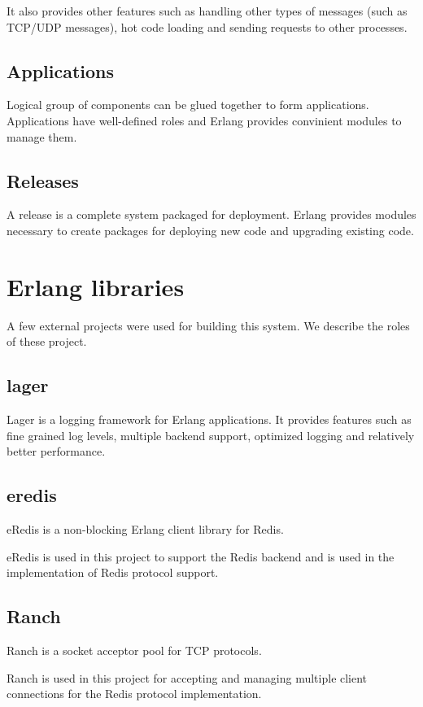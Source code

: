 It also provides other features such as handling other types of messages (such
as TCP/UDP messages), hot code loading and sending requests to other
processes.

\subsection{Applications}
\label{section:concepts.applications}
Logical group of components can be glued together to form applications.
Applications have well-defined roles and Erlang provides convinient modules to
manage them.

\subsection{Releases}
\label{section:concepts.releases}
A release is a complete system packaged for deployment. Erlang provides modules
necessary to create packages for deploying new code and upgrading existing code.

\section{Erlang libraries}

A few external projects were used for building this system. We describe the
roles of these project.

\subsection{lager}

Lager \citep{lager} is a logging framework for Erlang applications. It provides
features such as fine grained log levels, multiple backend support, optimized
logging and relatively better performance.

\subsection{eredis}

eRedis \citep{eredis} is a non-blocking Erlang client library for Redis.

eRedis is used in this project to support the Redis backend and is used in the
implementation of Redis protocol support.

\subsection{Ranch}

Ranch \citep{ranch} is a socket acceptor pool for TCP protocols.

Ranch is used in this project for accepting and managing multiple client
connections for the Redis protocol implementation.

